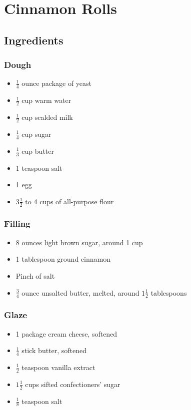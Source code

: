 \documentclass{book}
\begin{document}
\section*{Cinnamon Rolls}
\subsection*{Ingredients}
\subsubsection*{Dough}
\begin{itemize}
\item
$\frac{1}{4}$ ounce package of yeast
\item
$\frac{1}{2}$ cup warm water
\item
$\frac{1}{2}$ cup scalded milk
\item
$\frac{1}{4}$ cup sugar
\item
$\frac{1}{3}$ cup butter
\item
1 teaspoon salt
\item
1 egg
\item
$3 \frac{1}{2}$ to 4 cups of all-purpose flour
\end{itemize}
\subsubsection*{Filling}
\begin{itemize}
\item
8 ounces light brown sugar, around 1 cup
\item
1 tablespoon ground cinnamon
\item
Pinch of salt
\item
$\frac{3}{4}$ ounce unsalted butter, melted, around $1 \frac{1}{2}$ tablespoons
\end{itemize}
\subsubsection*{Glaze}
\begin{itemize}
\item
1 package cream cheese, softened
\item
$\frac{1}{4}$ stick butter, softened
\item
$\frac{1}{2}$ teaspoon vanilla extract
\item
$1\frac{1}{2}$ cups sifted confectioners' sugar
\item
$\frac{1}{8}$ teaspoon salt
\end{itemize}
\end{document}
